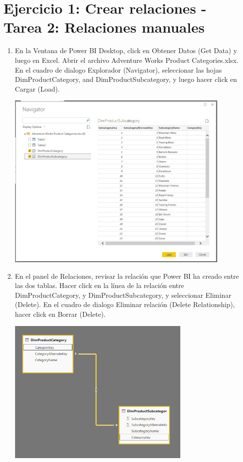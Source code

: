 \section{Ejercicio 1: Crear relaciones - Tarea 2: Relaciones manuales} 

\begin{enumerate}[1.]
	\item En la Ventana de Power BI Desktop, click en Obtener Datos (Get Data) y luego en Excel. Abrir el archivo Adventure Works Product Categories.xlsx. En el cuadro de dialogo Explorador (Navigator), seleccionar las hojas DimProductCategory, and
DimProductSubcategory, y luego hacer click en Cargar (Load).
	
	\begin{center}
	\includegraphics[width=11cm]{./Imagenes/21} 
	\end{center}

	\item En el panel de Relaciones, revisar la relación que Power BI ha creado entre las dos tablas.
 Hacer click en la línea de la relación entre DimProductCategory, y DimProductSubcategory, y seleccionar
Eliminar (Delete). En el cuadro de dialogo Eliminar relación (Delete Relationship), hacer click en Borrar (Delete).

	

	\begin{center}
	\includegraphics[width=9cm]{./Imagenes/22} 
	\end{center}


\end{enumerate}
